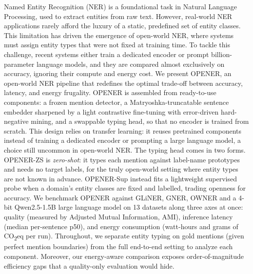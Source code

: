 Named Entity Recognition (NER) is a foundational task in Natural Language Processing, used to extract entities from raw text. However, real-world NER applications rarely afford the luxury of a static, predefined set of entity classes. This limitation has driven the emergence of open-world NER, where systems must assign entity types that were not fixed at training time. To tackle this challenge, recent systems either train a dedicated encoder or prompt billion-parameter language models, and they are compared almost exclusively on accuracy, ignoring their compute and energy cost.
We present OPENER, an open-world NER pipeline that redefines the optimal trade-off between accuracy, latency, and energy frugality. OPENER is assembled from ready-to-use components: a frozen mention detector, a Matryoshka-truncatable sentence embedder sharpened by a light contrastive fine-tuning with error-driven hard-negative mining, and a swappable typing head, so that no encoder is trained from scratch.
This design relies on transfer learning: it reuses pretrained components instead of training a dedicated encoder or prompting a large language model, a choice still uncommon in open-world NER.
The typing head comes in two forms. OPENER-ZS is \emph{zero-shot}: it types each mention against label-name prototypes and needs no target labels, for the truly open-world setting where entity types are not known in advance. OPENER-Sup instead fits a lightweight supervised probe when a domain's entity classes are fixed and labelled, trading openness for accuracy.
We benchmark OPENER against GLiNER, GNER, OWNER and a 4-bit Qwen2.5-1.5B large language model on 13 datasets along three axes at once: quality (measured by Adjusted Mutual Information, AMI), inference latency (median per-sentence p50), and energy consumption (watt-hours and grams of CO\textsubscript{2}eq per run).
Throughout, we separate entity typing on gold mentions (given perfect mention boundaries) from the full end-to-end setting to analyze each component. Moreover, our energy-aware comparison exposes order-of-magnitude efficiency gaps that a quality-only evaluation would hide.
